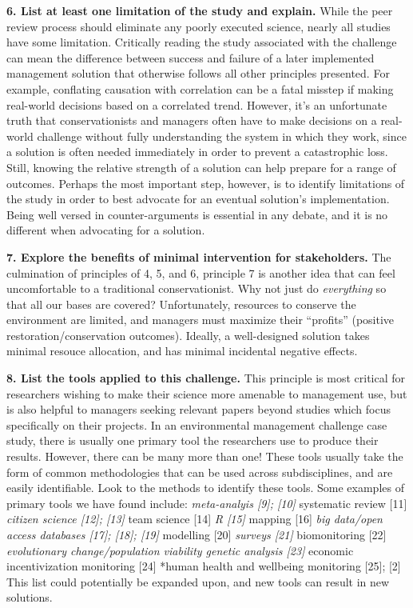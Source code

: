 \documentclass[10pt,letterpaper]{article}
\begin{document}
\textbf{6. List at least one limitation of the study and explain.} While
the peer review process should eliminate any poorly executed science,
nearly all studies have some limitation. Critically reading the study
associated with the challenge can mean the difference between success
and failure of a later implemented management solution that otherwise
follows all other principles presented. For example, conflating
causation with correlation can be a fatal misstep if making real-world
decisions based on a correlated trend. However, it's an unfortunate
truth that conservationists and managers often have to make decisions on
a real-world challenge without fully understanding the system in which
they work, since a solution is often needed immediately in order to
prevent a catastrophic loss. Still, knowing the relative strength of a
solution can help prepare for a range of outcomes. Perhaps the most
important step, however, is to identify limitations of the study in
order to best advocate for an eventual solution's implementation. Being
well versed in counter-arguments is essential in any debate, and it is
no different when advocating for a solution.

\textbf{7. Explore the benefits of minimal intervention for
stakeholders.} The culmination of principles of 4, 5, and 6, principle 7
is another idea that can feel uncomfortable to a traditional
conservationist. Why not just do \emph{everything} so that all our bases
are covered? Unfortunately, resources to conserve the environment are
limited, and managers must maximize their ``profits'' (positive
restoration/conservation outcomes). Ideally, a well-designed solution
takes minimal resouce allocation, and has minimal incidental negative
effects.

\textbf{8. List the tools applied to this challenge.} This principle is
most critical for researchers wishing to make their science more
amenable to management use, but is also helpful to managers seeking
relevant papers beyond studies which focus specifically on their
projects. In an environmental management challenge case study, there is
usually one primary tool the researchers use to produce their results.
However, there can be many more than one! These tools usually take the
form of common methodologies that can be used across subdisciplines, and
are easily identifiable. Look to the methods to identify these tools.
Some examples of primary tools we have found include: \emph{meta-analyis
{[}9{]}; {[}10{]} }systematic review {[}11{]} \emph{citizen science
{[}12{]}; {[}13{]} }team science {[}14{]} \emph{R {[}15{]} }mapping
{[}16{]} \emph{big data/open access databases {[}17{]}; {[}18{]};
{[}19{]} }modelling {[}20{]} \emph{surveys {[}21{]} }biomonitoring
{[}22{]} \emph{evolutionary change/population viability genetic analysis
{[}23{]} }economic incentivization monitoring {[}24{]} *human health and
wellbeing monitoring {[}25{]}; {[}2{]} This list could potentially be
expanded upon, and new tools can result in new solutions.
\end{document}

